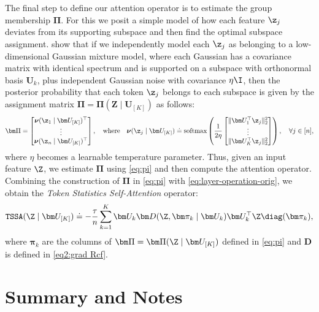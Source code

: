 \documentclass[../../book-main.tex]{subfiles}
\begin{document}
The final step to define our attention operator is to estimate the group membership $\bm\Pi$. For this we posit a simple model of how each feature \(\z_{j}\) deviates from its supporting subspace and then find the optimal subspace assignment. \cite{yu2023white} show that if we independently model each \(\z_{j}\) as belonging to a low-dimensional Gaussian mixture model, where each Gaussian has a covariance matrix with identical spectrum and is supported on a subspace with orthonormal basis \(\bm U_{k}\), plus independent Gaussian noise with covariance \(\eta \I\), then the posterior probability that each token \(\z_{j}\) belongs to each subspace is given by the assignment matrix \(\bm \Pi = \bm \Pi(\bm Z \mid \bm U_{[K]})\) as follows:
\begin{align}\label{eq:pi}
    \bm \Pi = \begin{bmatrix} \boldsymbol{\nu}(\z_1 \mid \bm U_{[K]})^\top \\ \vdots \\ \boldsymbol{\nu}(\z_n \mid \bm U_{[K]})^\top \end{bmatrix}, \quad
\text{where} \quad 
\boldsymbol{\nu}(\z_j \mid \bm U_{[K]}) \doteq \operatorname{softmax}\left( \frac{1}{2\eta} \begin{bmatrix} \|  \bm U_{1}^{\top} \z_j \|_2^2 \\ \vdots \\ \| \bm U_{K}^{\top} \z_j \|_2^2 \end{bmatrix} \right), \quad \forall j \in [n],
\end{align}
where $\eta$ becomes a learnable temperature parameter. Thus, given an input feature \(\Z\), we estimate \(\bm\Pi\) using \eqref{eq:pi} and then compute the attention operator.  Combining the construction of $\bm\Pi$ in \eqref{eq:pi} with 
\eqref{eq:layer-operation-orig}, we obtain the {\em Token Statistics Self-Attention} operator: 
\begin{equation}
    \label{eq:tssa}
   \texttt{TSSA}(\Z \mid \bm U_{[K]}) \doteq -\frac{\tau}{n}\sum_{k = 1}^{K}\bm U_{k}\bm D(\Z, \bm\pi_{k} \mid \bm U_{k})\bm U_{k}^{\top}\Z\diag(\bm \pi_{k}),
\end{equation}
where \(\bm\pi_{k}\) are the columns of \(\bm\Pi = \bm\Pi(\Z \mid \bm U_{[K]})\) defined in \eqref{eq:pi} and \(\bm D\) is defined in \eqref{eq2:grad Rcf}. 




\section{Summary and Notes}
\end{document}
